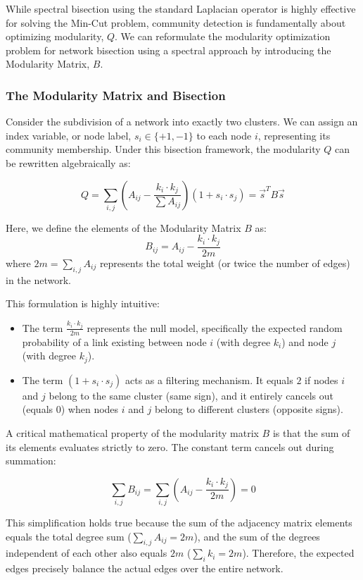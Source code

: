 While spectral bisection using the standard Laplacian operator is highly effective for solving the Min-Cut problem, community detection is fundamentally about optimizing modularity, $Q$. We can reformulate the modularity optimization problem for network bisection using a spectral approach by introducing the Modularity Matrix, $B$.

\subsubsection{The Modularity Matrix and Bisection}

Consider the subdivision of a network into exactly two clusters. We can assign an index variable, or node label, $s_i \in \{+1, -1\}$ to each node $i$, representing its community membership. Under this bisection framework, the modularity $Q$ can be rewritten algebraically as:

$$Q = \sum_{i,j} \left( A_{ij} - \frac{k_i \cdot k_j}{\sum A_{ij}} \right) (1 + s_i \cdot s_j) = \vec{s}^T B \vec{s}$$

Here, we define the elements of the Modularity Matrix $B$ as:
$$B_{ij} = A_{ij} - \frac{k_i \cdot k_j}{2m}$$
where $2m = \sum_{i,j} A_{ij}$ represents the total weight (or twice the number of edges) in the network.

This formulation is highly intuitive:
\begin{itemize}
    \item The term $\frac{k_i \cdot k_j}{2m}$ represents the null model, specifically the expected random probability of a link existing between node $i$ (with degree $k_i$) and node $j$ (with degree $k_j$).
    \item The term $(1 + s_i \cdot s_j)$ acts as a filtering mechanism. It equals $2$ if nodes $i$ and $j$ belong to the same cluster (same sign), and it entirely cancels out (equals $0$) when nodes $i$ and $j$ belong to different clusters (opposite signs).
\end{itemize}

A critical mathematical property of the modularity matrix $B$ is that the sum of its elements evaluates strictly to zero. The constant term cancels out during summation:

$$\sum_{i,j} B_{ij} = \sum_{i,j} \left( A_{ij} - \frac{k_i \cdot k_j}{2m} \right) = 0$$

This simplification holds true because the sum of the adjacency matrix elements equals the total degree sum ($\sum_{i,j} A_{ij} = 2m$), and the sum of the degrees independent of each other also equals $2m$ ($\sum_i k_i = 2m$). Therefore, the expected edges precisely balance the actual edges over the entire network.

